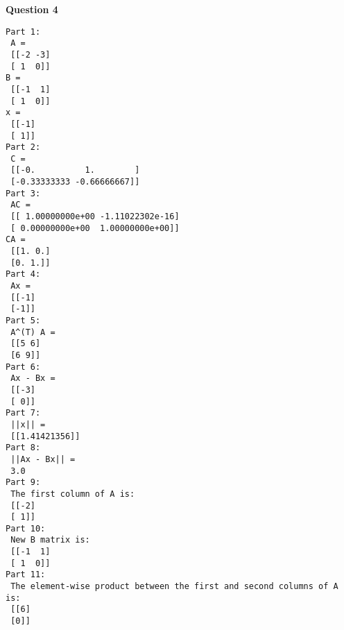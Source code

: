 \documentclass[12pt]{article} %
\begin{document}
\begin{flushleft}
\vspace{1cm}

\textbf{Question 4}
\begin{verbatim}
Part 1:
 A = 
 [[-2 -3]
 [ 1  0]] 
B = 
 [[-1  1]
 [ 1  0]] 
x = 
 [[-1]
 [ 1]]
Part 2:
 C = 
 [[-0.          1.        ]
 [-0.33333333 -0.66666667]]
Part 3:
 AC = 
 [[ 1.00000000e+00 -1.11022302e-16]
 [ 0.00000000e+00  1.00000000e+00]] 
CA = 
 [[1. 0.]
 [0. 1.]]
Part 4: 
 Ax = 
 [[-1]
 [-1]]
Part 5:
 A^(T) A = 
 [[5 6]
 [6 9]]
Part 6:
 Ax - Bx = 
 [[-3]
 [ 0]]
Part 7:
 ||x|| = 
 [[1.41421356]]
Part 8:
 ||Ax - Bx|| = 
 3.0
Part 9:
 The first column of A is: 
 [[-2]
 [ 1]]
Part 10:
 New B matrix is: 
 [[-1  1]
 [ 1  0]]
Part 11:
 The element-wise product between the first and second columns of A is: 
 [[6]
 [0]]
\end{verbatim}
\end{flushleft}
\end{document}

